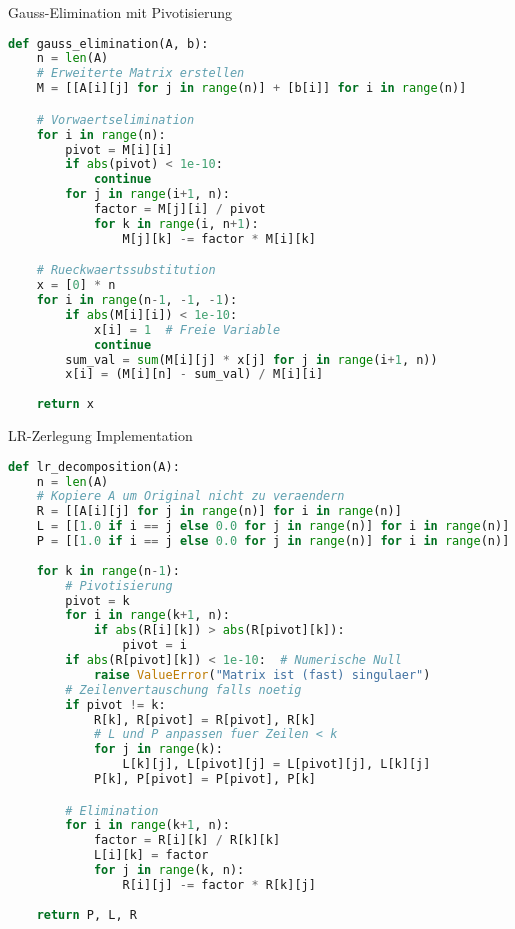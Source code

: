 \begin{examplecode}{Gauss-Elimination mit Pivotisierung}
\begin{lstlisting}[language=Python, style=basesmol]
def gauss_elimination(A, b):
    n = len(A)
    # Erweiterte Matrix erstellen
    M = [[A[i][j] for j in range(n)] + [b[i]] for i in range(n)]

    # Vorwaertselimination
    for i in range(n):
        pivot = M[i][i]
        if abs(pivot) < 1e-10:
            continue
        for j in range(i+1, n):
            factor = M[j][i] / pivot
            for k in range(i, n+1):
                M[j][k] -= factor * M[i][k]

    # Rueckwaertssubstitution
    x = [0] * n
    for i in range(n-1, -1, -1):
        if abs(M[i][i]) < 1e-10:
            x[i] = 1  # Freie Variable
            continue
        sum_val = sum(M[i][j] * x[j] for j in range(i+1, n))
        x[i] = (M[i][n] - sum_val) / M[i][i]
    
    return x
\end{lstlisting}    
\end{examplecode}





\begin{examplecode}{LR-Zerlegung Implementation}
\begin{lstlisting}[language=Python, style=basesmol]
def lr_decomposition(A):
    n = len(A)
    # Kopiere A um Original nicht zu veraendern
    R = [[A[i][j] for j in range(n)] for i in range(n)]
    L = [[1.0 if i == j else 0.0 for j in range(n)] for i in range(n)]
    P = [[1.0 if i == j else 0.0 for j in range(n)] for i in range(n)]
    
    for k in range(n-1):
        # Pivotisierung
        pivot = k
        for i in range(k+1, n):
            if abs(R[i][k]) > abs(R[pivot][k]):
                pivot = i
        if abs(R[pivot][k]) < 1e-10:  # Numerische Null
            raise ValueError("Matrix ist (fast) singulaer")
        # Zeilenvertauschung falls noetig
        if pivot != k:
            R[k], R[pivot] = R[pivot], R[k]
            # L und P anpassen fuer Zeilen < k
            for j in range(k):
                L[k][j], L[pivot][j] = L[pivot][j], L[k][j]
            P[k], P[pivot] = P[pivot], P[k]

        # Elimination
        for i in range(k+1, n):
            factor = R[i][k] / R[k][k]
            L[i][k] = factor
            for j in range(k, n):
                R[i][j] -= factor * R[k][j]
               
    return P, L, R
\end{lstlisting}
\end{examplecode}

